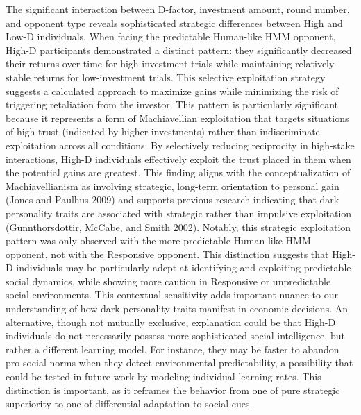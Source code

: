 \documentclass[
]{article}
\begin{document}
The significant interaction between D-factor, investment amount, round number, and opponent type reveals sophisticated strategic differences between High and Low-D individuals. When facing the predictable Human-like HMM opponent, High-D participants demonstrated a distinct pattern: they significantly decreased their returns over time for high-investment trials while maintaining relatively stable returns for low-investment trials. This selective exploitation strategy suggests a calculated approach to maximize gains while minimizing the risk of triggering retaliation from the investor.
This pattern is particularly significant because it represents a form of Machiavellian exploitation that targets situations of high trust (indicated by higher investments) rather than indiscriminate exploitation across all conditions. By selectively reducing reciprocity in high-stake interactions, High-D individuals effectively exploit the trust placed in them when the potential gains are greatest. This finding aligns with the conceptualization of Machiavellianism as involving strategic, long-term orientation to personal gain (Jones and Paulhus 2009) and supports previous research indicating that dark personality traits are associated with strategic rather than impulsive exploitation (Gunnthorsdottir, McCabe, and Smith 2002).
Notably, this strategic exploitation pattern was only observed with the more predictable Human-like HMM opponent, not with the Responsive opponent. This distinction suggests that High-D individuals may be particularly adept at identifying and exploiting predictable social dynamics, while showing more caution in Responsive or unpredictable social environments. This contextual sensitivity adds important nuance to our understanding of how dark personality traits manifest in economic decisions. An alternative, though not mutually exclusive, explanation could be that High-D individuals do not necessarily possess more sophisticated social intelligence, but rather a different learning model. For instance, they may be faster to abandon pro-social norms when they detect environmental predictability, a possibility that could be tested in future work by modeling individual learning rates. This distinction is important, as it reframes the behavior from one of pure strategic superiority to one of differential adaptation to social cues.
\end{document}
